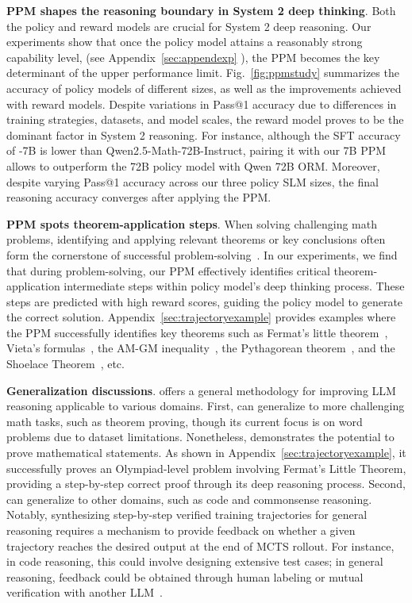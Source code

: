  
 
 


  \noindent\textbf{PPM shapes the reasoning boundary in System 2 deep thinking}. Both the policy and reward models are crucial for System 2 deep reasoning. Our experiments show that once the policy model attains a reasonably strong capability level, 
 (see Appendix~\ref{sec:appendexp} ), the PPM becomes the key determinant of the upper performance limit.
   Fig.~\ref{fig:ppmstudy} summarizes the  accuracy of policy models of different sizes, as well as the improvements achieved with reward models. Despite variations in Pass@1 accuracy due to differences in training strategies, datasets, and model scales, the reward model proves to be the dominant factor in System 2 reasoning. For instance, although the SFT accuracy of {\sysname}-7B is lower than Qwen2.5-Math-72B-Instruct, pairing it with our 7B PPM allows {\sysname} to outperform the 72B policy model with Qwen 72B ORM. Moreover, despite varying Pass@1 accuracy across our three policy SLM sizes, the final reasoning accuracy converges after applying the PPM. 
   
   
  

 \noindent\textbf{PPM spots theorem-application steps}. When solving challenging math problems, identifying and applying relevant theorems or key conclusions often form the cornerstone of successful problem-solving~\citep{xin2024deepseek}. In our experiments, we  find that during {\sysname} problem-solving, our PPM effectively identifies critical theorem-application intermediate steps within policy model's deep thinking process. These steps are predicted with high reward scores, guiding the policy model to generate the correct solution. Appendix~\ref{sec:trajectoryexample} provides examples where the PPM successfully identifies key theorems such as Fermat's little theorem~\citep{fermattheorem}, Vieta's formulas~\citep{vietaformula}, the AM-GM inequality~\citep{amgm}, the Pythagorean theorem~\citep{pythagorean-theorem}, and the Shoelace Theorem~\citep{shoelace-theorem}, etc. 
 

  
  
  
  
\noindent\textbf{Generalization discussions}. 
{\sysname} offers a general methodology for improving LLM reasoning applicable to various domains. First, 
 {\sysname} can generalize to more challenging math tasks, such as theorem proving, though its current focus is on word problems due to dataset limitations. Nonetheless, {\sysname} demonstrates the potential to prove  mathematical statements. As shown in Appendix~\ref{sec:trajectoryexample}, it successfully proves an Olympiad-level problem involving Fermat's Little Theorem, providing a step-by-step correct proof through its deep reasoning process. Second, \sysname can generalize to other domains, such as code and commonsense reasoning. Notably, synthesizing step-by-step verified training trajectories for general reasoning requires a mechanism to provide feedback on whether a given trajectory reaches the desired output at the end of MCTS rollout.  For instance, in code reasoning, this could involve designing extensive test cases; in general reasoning, feedback could be obtained through human labeling or mutual verification with another LLM~\citep{rstar}.

 
